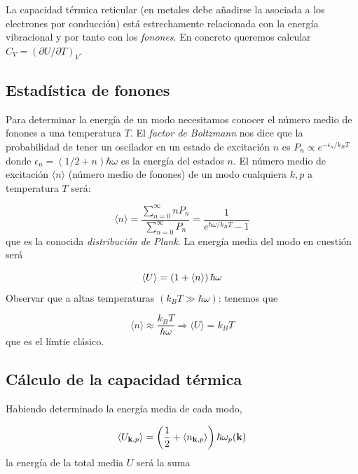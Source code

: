 La capacidad térmica reticular (en metales debe añadirse la asociada a los electrones por conducción) está estrechamente relacionada con la energía vibracional y por tanto con los \textit{fonones}. En concreto queremos calcular $C_V = (\partial U / \partial T)_V$. 

\subsection{Estadística de fonones}

Para determinar la energía de un modo necesitamos conocer el número medio de fonones a una temperatura $T$. El \textit{factor de Boltzmann} nos dice que la probabilidad de tener un oscilador en un estado de excitación $n$ es $P_n \propto e^{-\epsilon_n/k_B T}$ donde $\epsilon_n = (1/2+n)\hbar \omega$ es la energía del estados $n$. El número medio de excitación $\langle n \rangle$ (número medio de fonones) de un modo cualquiera $k,p$ a temperatura $T$ será:

\begin{equation}
    \langle n \rangle = \frac{\sum_{n=0}^\infty n P_n}{\sum_{n=0}^{\infty} P_n} = \frac{1}{e^{\hbar \omega/k_B T} -1}
\end{equation}
que es la conocida \textit{distribución de Plank}. La energía media del modo en cuestión será

\begin{equation}
    \langle U \rangle = \left( 1+\langle n \rangle \right) \hbar \omega
\end{equation}
Observar que a altas temperaturas $(k_B T \gg \hbar \omega)$: tenemos que

\begin{equation}
    \langle n \rangle \approx \frac{k_B T}{\hbar \omega} \Longrightarrow \langle U \rangle = k_B T
\end{equation}
que es el límtie clásico. 

\subsection{Cálculo de la capacidad térmica}

Habiendo determinado la energía media de cada modo,

\begin{equation*}
    \langle U_{\mathbf{k},p} \rangle = \left( \frac{1}{2} + \langle n_{\mathbf{k},p} \rangle  \right) \hbar \omega_p (\mathbf{k})  
\end{equation*}
la energía de la total media $U$ será la suma 

